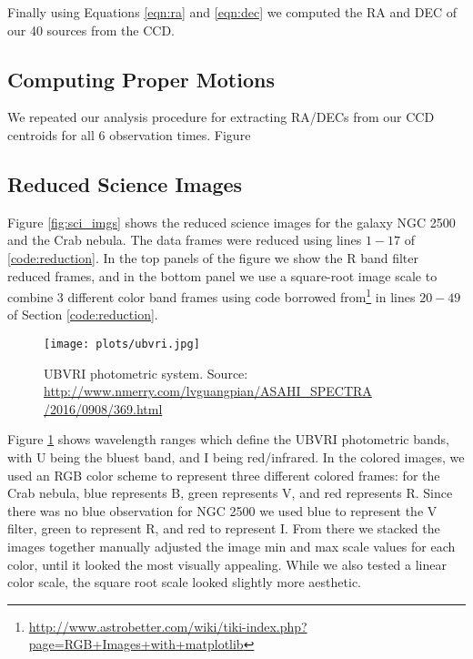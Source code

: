 \documentclass[preprint]{aastex62}
\begin{document}
Finally using Equations \ref{eqn:ra} and \ref{eqn:dec} we computed the RA and DEC of our 40 sources from the CCD.


\subsection{Computing Proper Motions}
We repeated our analysis procedure for extracting RA/DECs from our CCD centroids for all 6 observation times. Figure


\subsection{Reduced Science Images}
Figure \ref{fig:sci_imgs} shows the reduced science images for the galaxy NGC 2500 and the Crab nebula. The data frames were reduced using lines $1-17$ of \ref{code:reduction}. In the top panels of the figure we show the R band filter reduced frames, and in the bottom panel we use a square-root image scale to combine 3 different color band frames using code borrowed from\footnote{\href{http://www.astrobetter.com/wiki/tiki-index.php?page=RGB+Images+with+matplotlib}{http://www.astrobetter.com/wiki/tiki-index.php?page=RGB+Images+with+matplotlib}} in lines $20-49$ of Section \ref{code:reduction}. 

\begin{figure}[H]
\begin{center}
\texttt{[image: plots/ubvri.jpg]}
\caption{UBVRI photometric system. Source: \href{http://www.nmerry.com/lvguangpian/ASAHI_SPECTRA/2016/0908/369.html}{http://www.nmerry.com/lvguangpian/ASAHI\_SPECTRA\\/2016/0908/369.html}} \label{fig:ubvri}
\end{center}
\end{figure}

Figure \ref{fig:ubvri} shows wavelength ranges which define the UBVRI photometric bands, with U being the bluest band, and I being red/infrared. In the colored images, we used an RGB color scheme to represent three different colored frames: for the Crab nebula, blue represents B, green represents V, and red represents R. Since there was no blue observation for NGC 2500 we used blue to represent the V filter, green to represent R, and red to represent I. From there we stacked the images together manually adjusted the image min and max scale values for each color, until it looked the most visually appealing. While we also tested a linear color scale, the square root scale looked slightly more aesthetic.
\end{document}
